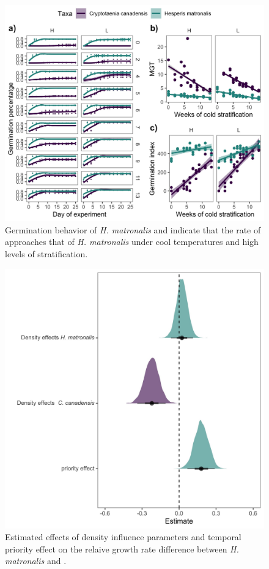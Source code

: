 \documentclass[11pt]{article}\usepackage[]{graphicx}\usepackage[]{color}
\begin{document}
\begin{figure}[h!]
    \centering
         \includegraphics[width=\textwidth]{..//figure/crp_hesp1.jpeg}
    \caption{Germination behavior of \textit{H. matronalis} and  indicate that the rate of  approaches that of \textit{H. matronalis} under cool temperatures and high levels of stratification. } 
    \label{fig:aft}
\end{figure}

\begin{figure}[h!]
    \centering
\includegraphics[width=\textwidth]{..//figure/mu_plots.jpeg}
    \caption{Estimated effects of density influence parameters and temporal priority effect on the relaive growth rate difference between \textit{H. matronalis} and .  } 
    \label{fig:Cc}
\end{figure}
\end{document}
